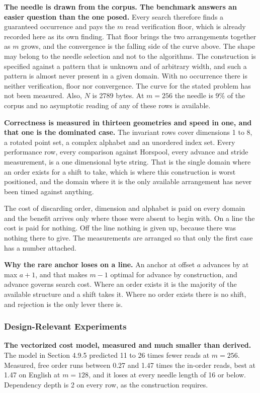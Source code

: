 \textbf{The needle is drawn from the corpus. The benchmark answers an easier question than the one posed.} Every search therefore finds a guaranteed occurrence and pays the \(m\) read verification floor, which is already recorded here as its own finding. That floor brings the two arrangements together as \(m\) grows, and the convergence is the falling side of the curve above. The shape may belong to the needle selection and not to the algorithms. The construction is specified against a pattern that is unknown and of arbitrary width, and such a pattern is almost never present in a given domain. With no occurrence there is neither verification, floor nor convergence. The curve for the stated problem has not been measured. Also, \(N\) is 2789 bytes. At \(m = 256\) the needle is 9\% of the corpus and no asymptotic reading of any of these rows is available.

\textbf{Correctness is measured in thirteen geometries and speed in one, and that one is the dominated case.} The invariant rows cover dimensions 1 to 8, a rotated point set, a complex alphabet and an unordered index set. Every performance row, every comparison against Horspool, every advance and stride measurement, is a one dimensional byte string. That is the single domain where an order exists for a shift to take, which is where this construction is worst positioned, and the domain where it is the only available arrangement has never been timed against anything.

The cost of discarding order, dimension and alphabet is paid on every domain and the benefit arrives only where those were absent to begin with. On a line the cost is paid for nothing. Off the line nothing is given up, because there was nothing there to give. The measurements are arranged so that only the first case has a number attached.

\textbf{Why the rare anchor loses on a line.} An anchor at offset \(a\) advances by at max \(a+1\), and that makes \(m-1\) optimal for advance by construction, and advance governs search cost. Where an order exists it is the majority of the available structure and a shift takes it. Where no order exists there is no shift, and rejection is the only lever there is.

\subsubsection{Design-Relevant Experiments}

\textbf{The vectorized cost model, measured and much smaller than derived.} The model in Section 4.9.5 predicted 11 to 26 times fewer reads at \(m = 256\). Measured, free order runs between 0.27 and 1.47 times the in-order reads, best at 1.47 on English at \(m = 128\), and it loses at every needle length of 16 or below. Dependency depth is 2 on every row, as the construction requires.

